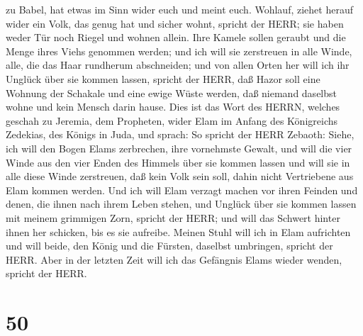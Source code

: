 zu Babel, hat etwas im Sinn wider euch und meint euch. 
Wohlauf, ziehet herauf wider ein Volk, das genug hat und sicher wohnt,
spricht der HERR; sie haben weder Tür noch Riegel und wohnen allein.
 Ihre Kamele sollen geraubt und die Menge ihres Viehs
genommen werden; und ich will sie zerstreuen in alle Winde, alle, die
das Haar rundherum abschneiden; und von allen Orten her will ich ihr
Unglück über sie kommen lassen, spricht der HERR,  daß
Hazor soll eine Wohnung der Schakale und eine ewige Wüste werden, daß
niemand daselbst wohne und kein Mensch darin hause.  Dies
ist das Wort des HERRN, welches geschah zu Jeremia, dem Propheten, wider
Elam im Anfang des Königreichs Zedekias, des Königs in Juda, und sprach:
 So spricht der HERR Zebaoth: Siehe, ich will den Bogen
Elams zerbrechen, ihre vornehmste Gewalt,  und will die
vier Winde aus den vier Enden des Himmels über sie kommen lassen und
will sie in alle diese Winde zerstreuen, daß kein Volk sein soll, dahin
nicht Vertriebene aus Elam kommen werden.  Und ich will
Elam verzagt machen vor ihren Feinden und denen, die ihnen nach ihrem
Leben stehen, und Unglück über sie kommen lassen mit meinem grimmigen
Zorn, spricht der HERR; und will das Schwert hinter ihnen her schicken,
bis es sie aufreibe.  Meinen Stuhl will ich in Elam
aufrichten und will beide, den König und die Fürsten, daselbst
umbringen, spricht der HERR.  Aber in der letzten Zeit will
ich das Gefängnis Elams wieder wenden, spricht der HERR.

\hypertarget{section-49}{%
\section{50}\label{section-49}}

